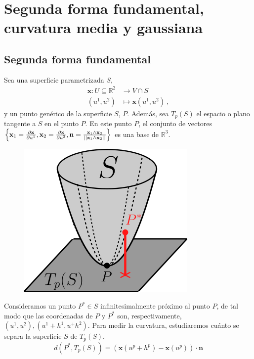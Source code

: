 \chapter{Segunda forma fundamental, curvatura media y gaussiana}

\section{Segunda forma fundamental}
\large 

Sea una superficie parametrizada $S$,
\begin{align*}
    \mathbf{x}:U\subseteq \mathbb{R}^2&\longrightarrow V\cap S\\
    (u^1,u^2)&\longmapsto \mathbf{x}(u^1,u^2) \ ,
\end{align*}
y un punto genérico de la superficie $S$, $P$. Además, sea $T_p(S)$ el espacio o plano tangente a $S$ en el punto $P$. En este punto $P$, el conjunto de vectores $\left \{ \mathbf{x}_1=\pdv{\mathbf{x}}{u^1},\mathbf{x}_2=\pdv{\mathbf{x}}{u^2} ,\mathbf{n}=\frac{\mathbf{x}_1\wedge \mathbf{x}_2}{||\mathbf{x}_1\wedge \mathbf{x}_2||}\right \}$ es una base de $\mathbb{R}^3$.\\

\begin{figure}
    \centering
    \includegraphics[scale=.5]{FOTOS/curvatura_dist.png}
\end{figure}

Consideramos un punto $P^*\in S$ infinitesimalmente próximo al punto $P$, de tal modo que las coordenadas de $P$ y $P^*$ son, respectivamente, $(u^1,u^2),(u^1+h^1,u^+h^2)$. Para medir la curvatura, estudiaremos cuánto se separa la superficie $S$ de $T_p(S)$.
$$
d(P^*,T_p(S))=(\mathbf{x}(u^p+h^p)-\mathbf{x}(u^p))\cdot \mathbf{n}
$$

